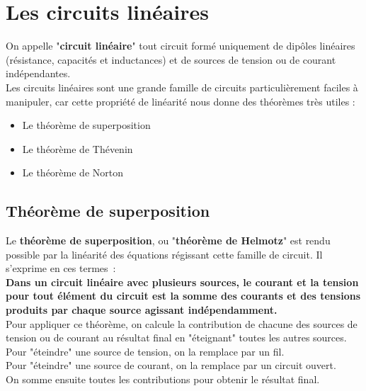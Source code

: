 \chapter{Les circuits linéaires}

On appelle "\textbf{circuit linéaire}" tout circuit formé uniquement de dipôles linéaires (résistance, capacités et inductances) et de sources de tension ou de courant indépendantes. \\

Les circuits linéaires sont une grande famille de circuits particulièrement faciles à manipuler, car cette propriété de linéarité nous donne des théorèmes très utiles :\\

\begin{itemize}
\item Le théorème de superposition
\item Le théorème de Thévenin
\item Le théorème de Norton
\end{itemize}


\section{Théorème de superposition}

Le \textbf{théorème de superposition}, ou "\textbf{théorème de Helmotz}" est rendu possible par la linéarité des équations régissant cette famille de circuit. Il s'exprime en ces termes~:\\

\textbf{Dans un circuit linéaire avec plusieurs sources, le courant et la tension pour tout élément du circuit est la somme des courants et des tensions produits par chaque source agissant indépendamment.} \\

Pour appliquer ce théorème, on calcule la contribution de chacune des sources de tension ou de courant au résultat final en "éteignant" toutes les autres sources.\\

Pour "éteindre" une source de tension, on la remplace par un fil. \\

Pour "éteindre" une source de courant, on la remplace par un circuit ouvert. \\

On somme ensuite toutes les contributions pour obtenir le résultat final.

